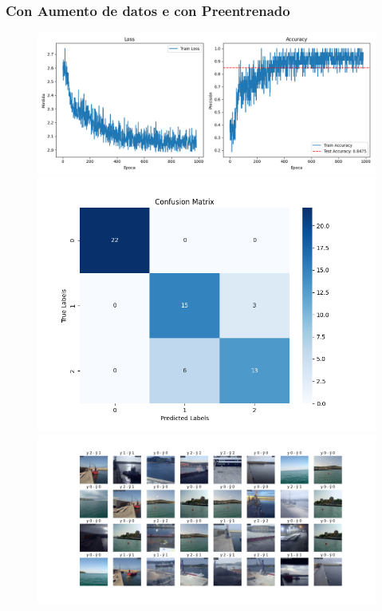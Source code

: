 \documentclass{article}
\begin{document}
\subsubsection{Con Aumento de datos e con Preentrenado}
\begin{figure}[H]
    \centering
    \begin{minipage}{0.55\textwidth}
        \centering
        \includegraphics[width=\linewidth]{../figures/LOSS__A_True_P_True_D_True_MLP_True_efficientnet_b4.png}
    \end{minipage}
    \begin{minipage}{0.3\textwidth}
        \centering
        \includegraphics[width=\linewidth]{../figures/CM__A_True_P_True_D_True_MLP_True_efficientnet_b4.png}
    \end{minipage}
    \begin{minipage}{0.7\textwidth}
        \centering
        \includegraphics[width=\linewidth]{../figures/GRID__A_True_P_True_D_True_MLP_True_efficientnet_b4.png}
    \end{minipage}
\end{figure}
\end{document}
